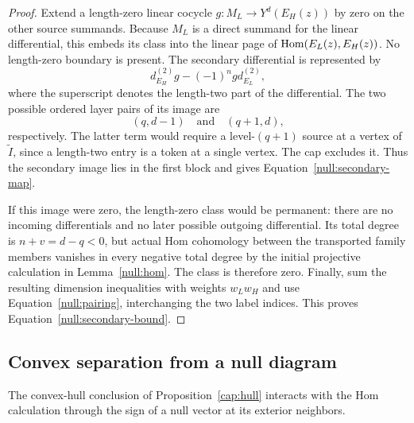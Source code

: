 \begin{proof}
Extend a length-zero linear cocycle $g:M_L\to Y^d(E_H(z))$ by zero
on the other source summands.  Because $M_L$ is a direct summand for
the linear differential, this embeds its class into the linear page
of $\operatorname{Hom}(E_L(z),E_H(z))$.  No length-zero boundary is present.
The secondary differential is represented by
\[
 d_{E_H}^{(2)}g-(-1)^n g d_{E_L}^{(2)},
\]
where the superscript denotes the length-two part of the differential.
The two possible ordered layer pairs of its image are
\[
 (q,d-1)\quad\text{and}\quad(q+1,d),
\]
respectively.  The latter term would require a level-$(q+1)$ source
at a vertex of $\widetilde I$, since a length-two entry is a token
at a single vertex.  The cap excludes it.  Thus the secondary image
lies in the first block and gives Equation~\eqref{null:secondary-map}.

If this image were zero, the length-zero class would be permanent:
there are no incoming differentials and no later possible outgoing
differential.  Its total degree is $n+v=d-q<0$, but actual Hom
cohomology between the transported family members vanishes in every
negative total degree by the initial projective calculation in
Lemma~\ref{null:hom}.  The class is therefore zero.  Finally, sum
the resulting dimension inequalities with weights $w_Lw_H$ and use
Equation~\eqref{null:pairing}, interchanging the two label indices.
This proves Equation~\eqref{null:secondary-bound}.
\end{proof}

\subsection{Convex separation from a null diagram}

The convex-hull conclusion of Proposition~\ref{cap:hull} interacts
with the Hom calculation through the sign of a null vector at its
exterior neighbors.

